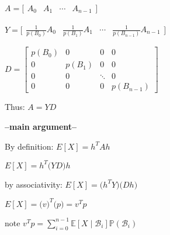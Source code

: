 \documentclass[6008notes.tex]{subfiles}
\begin{document}
$A = \bigg[\begin{array}{c|c|c|c}
A_0 &A_1 &\cdots &A_{n-1}
\end{array}\bigg]$

$Y = 
\bigg[\begin{array}{c|c|c|c}
\frac{1}{p(B_0)}A_0  &\frac{1}{p(B_1)}A_1 &\cdots &\frac{1}{p(B_{n-1})}A_{n-1}
\end{array}\bigg]$

$D = \begin{bmatrix}
p(B_0) & 0 &0  &0 \\ 
0 & p(B_1)& 0 & 0\\ 
0 & 0 &  \ddots & 0 \\ 
0 & 0 & 0 & p(B_{n-1})  
\end{bmatrix}$

Thus: $A=YD$

\textbf{--main argument--}

By definition: $E[X] = h^{T} A h$

$E[X] = h^{T} \big(YD \big) h$

by associativity: $E[X] = \big(h^{T} Y \big) \big( D h \big)$

$E[X] = \big(v\big)^{T} \big(p \big) = v ^T p$

note $v^T p = \sum _{i=0}^{n-1}\mathbb {E}[X\mid \mathcal{B}_{i}]\mathbb {P}(\mathcal{B}_{i})$
\end{document}

